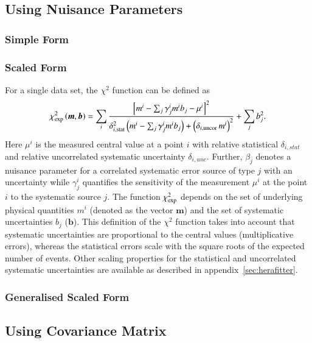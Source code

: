 \documentclass[11pt,a4paper]{article}
\begin{document}
\subsection{Using Nuisance Parameters}
\subsubsection{Simple Form}

\subsubsection{Scaled Form}

For a single data set, 
 the $\chi^2$ function can be defined as~\cite{H1:2009bp}
%
\begin{equation}
 \chi^2_{\rm exp}\left(\boldsymbol{m},\boldsymbol{b}\right) = %
 \sum_i
 \frac{\left[m^i
- \sum_j \gamma^i_j m^i b_j  - {\mu^i} \right]^2}
{ \textstyle \delta^2_{i,{\rm stat}}\left(m^i -  \sum_j \gamma^i_j m^i b_j\right)+
\left(\delta_{i,{\rm uncor}}\,  m^i\right)^2}
 + \sum_j b^2_j.
\label{eq:ave}\end{equation}
%
Here ${\mu^i}$ is the  measured central value  at a point $i$ 
with  relative statistical $\delta_{i,stat}$ 
and relative uncorrelated systematic uncertainty $\delta_{i,unc}$.
Further, $\beta_j$ denotes a nuisance parameter for
 a correlated systematic error  source of type $j$ with an uncertainty
 while
$\gamma^i_j$ 
quantifies the sensitivity of the
measurement ${\mu^i}$ at the point $i$ to the systematic source $j$. 
The function $\chi^2_{\rm exp}$ depends on the set of
underlying physical quantities $m^i$ 
(denoted as the vector $\boldsymbol{m}$) and 
 the set of systematic uncertainties $b_j$ ($\boldsymbol{b}$).
This definition of the $\chi^2$ function takes into account that
systematic uncertainties are proportional to the central values 
(multiplicative errors), whereas the statistical errors scale 
with the square roots of the expected number of events. 
Other scaling properties for the statistical and uncorrelated
systematic uncertainties are available as described in appendix~\ref{sec:herafitter}.
\subsubsection{Generalised Scaled Form}

\subsection{Using Covariance Matrix}
\end{document}
